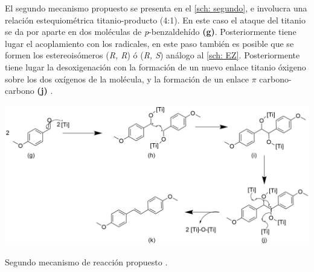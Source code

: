 \documentclass[fleqn,11pt]{SelfArx}
\begin{document}
El segundo mecanismo propuesto se presenta en el \autoref{sch: segundo}, e involucra una relaci\'on estequiom\'etrica titanio-producto (4:1). En este caso el ataque del titanio se da por aparte en dos mol\'eculas de \textit{p}-benzaldeh\'ido \textbf{(g)}. Posteriormente tiene lugar el acoplamiento con los radicales, en este paso tambi\'en es posible que se formen los estereois\'omeros (\textit{R, R}) \'o (\textit{R, S}) an\'alogo al \autoref{sch: EZ}. Posteriormente tiene lugar la desoxigenaci\'on con la formaci\'on de un nuevo enlace titanio \'oxigeno sobre los dos ox\'igenos de la mol\'ecula, y la formaci\'on de un enlace $\pi$ carbono-carbono \textbf{(j)} \cite{Wang2010}.
\begin{scheme}[h]
	\centering
	\includegraphics[width = \linewidth]{structures/mechanism2.png}
	\caption{Segundo mecanismo de reacci\'on propuesto \cite{Wang2010}.}
	\label{sch: segundo}
\end{scheme}
\end{document}
